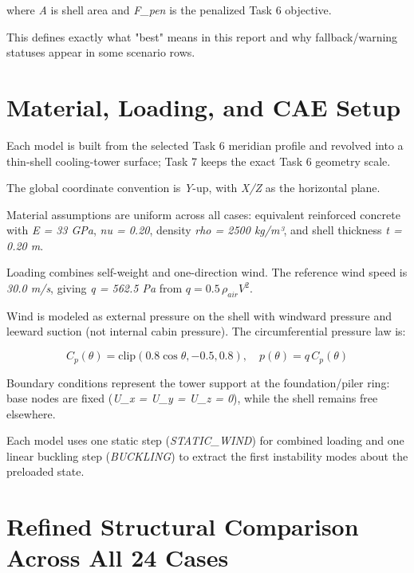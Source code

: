 \noindent where \textit{A} is shell area and \textit{F\_{pen}} is the penalized Task 6 objective.

\noindent This defines exactly what "best" means in this report and why fallback/warning statuses appear in some scenario rows.


\chapter{Material, Loading, and CAE Setup}


\noindent Each model is built from the selected Task 6 meridian profile and revolved into a thin-shell cooling-tower surface; Task 7 keeps the exact Task 6 geometry scale.

\noindent The global coordinate convention is \textit{Y}-up, with \textit{X/Z} as the horizontal plane.

\noindent Material assumptions are uniform across all cases: equivalent reinforced concrete with \textit{E = 33 GPa}, \textit{nu = 0.20}, density \textit{rho = 2500 kg/m³}, and shell thickness \textit{t = 0.20 m}.

\noindent Loading combines self-weight and one-direction wind. The reference wind speed is \textit{30.0 m/s}, giving \textit{q = 562.5 Pa} from \(q = 0.5\,\rho_{air}V^2\).

\noindent Wind is modeled as external pressure on the shell with windward pressure and leeward suction (not internal cabin pressure). The circumferential pressure law is:

\[
C_p(\theta) = \mathrm{clip}(0.8\cos\theta, -0.5, 0.8), \quad p(\theta) = q\,C_p(\theta)
\]

\noindent Boundary conditions represent the tower support at the foundation/piler ring: base nodes are fixed (\textit{U\_x = U\_y = U\_z = 0}), while the shell remains free elsewhere.

\noindent Each model uses one static step (\textit{STATIC\_WIND}) for combined loading and one linear buckling step (\textit{BUCKLING}) to extract the first instability modes about the preloaded state.


\chapter{Refined Structural Comparison Across All 24 Cases}


